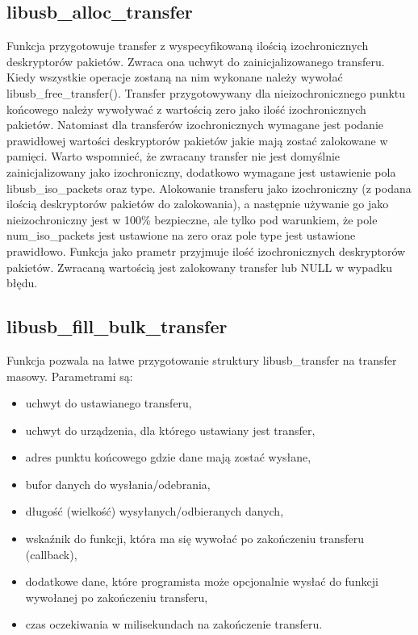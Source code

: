 \documentclass{BscUS}
\begin{document}
\subsection{libusb\_alloc\_transfer}
\noindent Funkcja przygotowuje transfer z wyspecyfikowaną ilością 	izochronicznych deskryptorów pakietów.
Zwraca ona uchwyt do zainicjalizowanego transferu. Kiedy wszystkie operacje zostaną na nim wykonane należy wywołać libusb\_free\_transfer().
Transfer przygotowywany dla nieizochronicznego punktu końcowego należy wywoływać z wartością zero jako ilość izochronicznych pakietów.
Natomiast dla transferów izochronicznych wymagane jest podanie prawidłowej wartości deskryptorów pakietów jakie mają zostać zalokowane w pamięci. Warto wspomnieć, że zwracany transfer nie jest domyślnie zainicjalizowany jako izochroniczny, dodatkowo wymagane jest ustawienie pola libusb\_iso\_packets oraz type.
Alokowanie transferu jako izochroniczny (z podana ilością deskryptorów pakietów do zalokowania), a następnie używanie go jako nieizochroniczny jest w 100\% bezpieczne, ale tylko pod warunkiem, że pole num\_iso\_packets jest ustawione na zero oraz pole type jest ustawione prawidłowo.
Funkcja jako prametr przyjmuje ilość izochronicznych deskryptorów pakietów.
Zwracaną wartością jest zalokowany transfer lub NULL w wypadku błędu.
\subsection{libusb\_fill\_bulk\_transfer}
\noindent Funkcja pozwala na łatwe przygotowanie struktury libusb\_transfer na transfer masowy.
\newline
Parametrami są:
\begin{itemize}
\item uchwyt do ustawianego transferu,
\item uchwyt do urządzenia, dla którego ustawiany jest transfer,
\item adres punktu końcowego gdzie dane mają zostać wysłane,
\item bufor danych do wysłania/odebrania,
\item długość (wielkość) wysyłanych/odbieranych danych,
\item wskaźnik do funkcji, która ma się wywołać po zakończeniu transferu (callback),
\item dodatkowe dane, które programista może opcjonalnie wysłać do funkcji wywołanej po zakończeniu transferu,
\item czas oczekiwania w milisekundach na zakończenie transferu.
\end{itemize}
\end{document}

